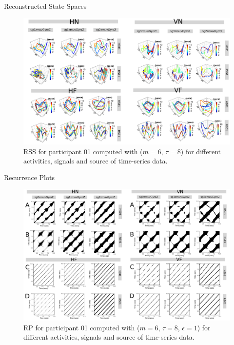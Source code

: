 {
\begin{frame}{Reconstructed State Spaces}
    \begin{figure}
        \includegraphics[width=0.8\linewidth]{./figs/results/ch6-rss/versions/drawing-v00}{}
	\caption{RSS for participant 01 computed with ($m=6$, $\tau=8$)
	for different activities, signals and source of time-series data.
	} 
   \end{figure}
\end{frame}
}





{
\begin{frame}{Recurrence Plots}
    \begin{figure}
        \includegraphics[width=0.8\linewidth]{./figs/results/ch6-rp/versions/drawing-v00}{}
	\caption{RP for participant 01 computed 
	with ($m=6$, $\tau=8$, $\epsilon=1$)
	for different activities, signals and source of time-series data.
	} 
   \end{figure}
	
\end{frame}
}





